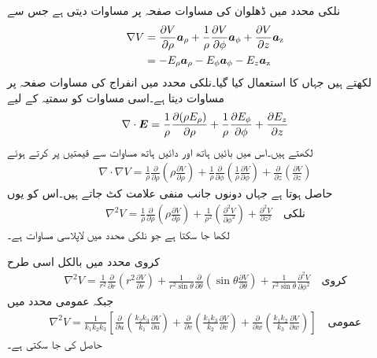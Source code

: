 نلکی محدد میں ڈھلوان کی مساوات صفحہ  پر مساوات  دیتی ہے جس سے 
\begin{gather}
\begin{aligned}\label{مساوات_لاپلاس_نلکی_پھیلاو_الف}
\nabla V &= \frac{\partial V}{\partial \rho} {\boldsymbol{a}}_{\rho}+\frac{1}{\rho}\frac{\partial V}{\partial \phi}  {\boldsymbol{a}}_{\phi}+\frac{\partial V}{\partial z}{\boldsymbol{a}}_{\textup{z}}\\
&=-E_\rho {\boldsymbol{a}}_{\rho}-E_\phi {\boldsymbol{a}}_{\phi}-E_z {\boldsymbol{a}}_{\textup{z}} 
\end{aligned}
\end{gather}
لکھتے  ہیں جہاں  کا استعمال کیا گیا۔نلکی محدد میں انفراج کی مساوات صفحہ  پر مساوات  دیتا ہے۔اسی مساوات کو سمتیہ  کے لیے
 \begin{align*}
\nabla \cdot {\ensuremath{{\boldsymbol{E}}}}=\frac{1}{\rho}\frac{\partial (\rho E_{\rho})}{\partial \rho}+\frac{1}{\rho}\frac{\partial E_{\phi}}{\partial \phi}  +  \frac{\partial E_{z}}{\partial z}
\end{align*}
لکھتے ہیں۔اس میں بائیں ہاتھ   اور دائیں ہاتھ مساوات  سے قیمتیں پر کرتے ہوئے
\begin{align*}
\nabla \cdot \nabla V=\frac{1}{\rho}\frac{\partial }{\partial \rho}\left(\rho \frac{\partial V}{\partial \rho}\right)
+\frac{1}{\rho}\frac{\partial }{\partial \phi}\left(\frac{1}{\rho}\frac{\partial V}{\partial \phi}  \right) 
+  \frac{\partial}{\partial z} \left(\frac{\partial V}{\partial z} \right)
\end{align*}
حاصل ہوتا ہے جہاں دونوں جانب منفی علامت کٹ جاتے ہیں۔اس کو یوں
\begin{align}
\nabla^2 V=\frac{1}{\rho}\frac{\partial }{\partial \rho}\left(\rho \frac{\partial V}{\partial \rho}\right)
+\frac{1}{\rho^2}\left(\frac{\partial^2 V}{\partial \phi^2}  \right) 
+  \frac{\partial^2 V}{\partial z^2}\quad {\text{نلکی}}
\end{align}
 لکھا جا سکتا ہے جو نلکی محدد میں لاپلاسی مساوات ہے۔

کروی محدد میں بالکل اسی طرح
\begin{align}\label{مساوات_لاپلاس_کروی_لاپلاسی}
\nabla^2 V=\frac{1}{r^2} \frac{\partial}{\partial r} \left(r^2\frac{\partial V}{\partial r} \right)+\frac{1}{r^2 \sin \theta} \frac{\partial}{\partial \theta} \left(\sin \theta \frac{\partial V}{\partial \theta}  \right)+\frac{1}{r^2 \sin \theta}\frac{\partial^2 V}{\partial \phi^2} \quad {\text{کروی}}
\end{align}
جبکہ عمومی محدد میں
\begin{align}\label{مساوات_لاپلاس_عمومی_لاپلاسی}
\nabla^2 V=\frac{1}{k_1 k_2 k_3}\left[\frac{\partial}{\partial u}\left(\frac{k_2 k_3}{k_1}\frac{\partial V}{\partial u} \right)+\frac{\partial}{\partial v}\left(\frac{k_1 k_3}{k_2}\frac{\partial V}{\partial v} \right) +\frac{\partial}{\partial w}\left(\frac{k_1 k_2}{k_3}\frac{\partial V}{\partial w} \right)\right] \quad{\text{عمومی}}
\end{align}
حاصل کی جا سکتی ہے۔

